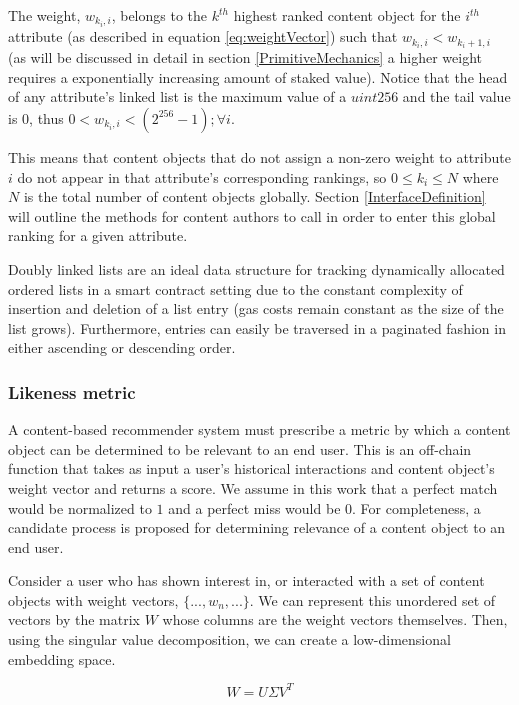 The weight, $w_{k_i,i}$, belongs to the $k^{th}$ highest ranked content object for the $i^{th}$ attribute (as described in equation \ref{eq:weightVector}) such that $w_{k_i,i} < w_{k_i+1,i}$ (as will be discussed in detail in section \ref{PrimitiveMechanics} a higher weight requires a exponentially increasing amount of staked value). Notice that the head of any attribute's linked list is the maximum value of a $uint256$ and the tail value is $0$, thus $0 < w_{k_i,i} < (2^{256}-1); \forall i$. 

This means that content objects that do not assign a non-zero weight to attribute $i$ do not appear in that attribute's corresponding rankings, so $0 \leq k_i \leq N$ where $N$ is the total number of content objects globally. Section \ref{InterfaceDefinition} will outline the methods for content authors to call in order to enter this global ranking for a given attribute. 

Doubly linked lists are an ideal data structure for tracking dynamically allocated ordered lists in a smart contract setting due to the constant complexity of insertion and deletion of a list entry (gas costs remain constant as the size of the list grows). Furthermore, entries can easily be traversed in a paginated fashion in either ascending or descending order. 

\subsubsection{Likeness metric}
\label{LikenessMetricDefinition}

A content-based recommender system must prescribe a metric by which a content object can be determined to be relevant to an end user. This is an off-chain function that takes as input a user's historical interactions and content object's weight vector and returns a score. We assume in this work that a perfect match would be normalized to $1$ and a perfect miss would be $0$. For completeness, a candidate process is proposed for determining relevance of a content object to an end user.

Consider a user who has shown interest in, or interacted with a set of content objects with weight vectors, $\{..., w_n,...\}$. We can represent this unordered set of vectors by the matrix $W$ whose columns are the weight vectors themselves. Then, using the singular value decomposition, we can create a low-dimensional embedding space.  

\begin{equation}
    W = U \Sigma V^T
\end{equation}

